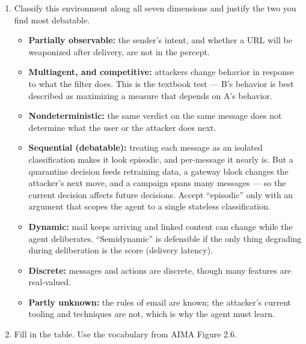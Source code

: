 \begin{enumerate}
\item Classify this environment along all seven dimensions and justify the two you find most
debatable.
\ansspace{6.0cm}
\begin{sol}
\begin{itemize}[leftmargin=1.5em]
\item \textbf{Partially observable:} the sender's intent, and whether a URL will be weaponized
after delivery, are not in the percept.
\item \textbf{Multiagent, and competitive:} attackers change behavior in response to what the
filter does. This is the textbook test --- B's behavior is best described as maximizing a
measure that depends on A's behavior.
\item \textbf{Nondeterministic:} the same verdict on the same message does not determine what
the user or the attacker does next.
\item \textbf{Sequential (debatable):} treating each message as an isolated classification makes
it look episodic, and per-message it nearly is. But a quarantine decision feeds retraining data,
a gateway block changes the attacker's next move, and a campaign spans many messages --- so the
current decision affects future decisions. Accept ``episodic'' only with an argument that
scopes the agent to a single stateless classification.
\item \textbf{Dynamic:} mail keeps arriving and linked content can change while the agent
deliberates. ``Semidynamic'' is defensible if the only thing degrading during deliberation is
the score (delivery latency).
\item \textbf{Discrete:} messages and actions are discrete, though many features are
real-valued.
\item \textbf{Partly unknown:} the rules of email are known; the attacker's current tooling and
techniques are not, which is why the agent must learn.
\end{itemize}
\end{sol}

\item Fill in the table. Use the vocabulary from AIMA Figure 2.6.


\end{enumerate}
